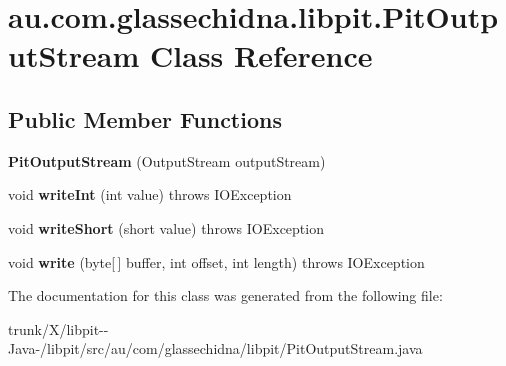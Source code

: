\hypertarget{classau_1_1com_1_1glassechidna_1_1libpit_1_1PitOutputStream}{\section{au.\-com.\-glassechidna.\-libpit.\-Pit\-Output\-Stream Class Reference}
\label{classau_1_1com_1_1glassechidna_1_1libpit_1_1PitOutputStream}
}
\subsection*{Public Member Functions}
\begin{DoxyCompactItemize}
\item 
\hypertarget{classau_1_1com_1_1glassechidna_1_1libpit_1_1PitOutputStream_a996957bf0051735d0c6d2f9ce3fb734b}{{\bfseries Pit\-Output\-Stream} (Output\-Stream output\-Stream)}\label{classau_1_1com_1_1glassechidna_1_1libpit_1_1PitOutputStream_a996957bf0051735d0c6d2f9ce3fb734b}

\item 
\hypertarget{classau_1_1com_1_1glassechidna_1_1libpit_1_1PitOutputStream_a36aea5e260c8e8db312c6ac3453ddd68}{void {\bfseries write\-Int} (int value)  throws I\-O\-Exception 	}\label{classau_1_1com_1_1glassechidna_1_1libpit_1_1PitOutputStream_a36aea5e260c8e8db312c6ac3453ddd68}

\item 
\hypertarget{classau_1_1com_1_1glassechidna_1_1libpit_1_1PitOutputStream_ad8d46d22c478d02af40f961fa3833272}{void {\bfseries write\-Short} (short value)  throws I\-O\-Exception 	}\label{classau_1_1com_1_1glassechidna_1_1libpit_1_1PitOutputStream_ad8d46d22c478d02af40f961fa3833272}

\item 
\hypertarget{classau_1_1com_1_1glassechidna_1_1libpit_1_1PitOutputStream_abf36f7729a6356967465f2599f5e3bd5}{void {\bfseries write} (byte\mbox{[}$\,$\mbox{]} buffer, int offset, int length)  throws I\-O\-Exception 	}\label{classau_1_1com_1_1glassechidna_1_1libpit_1_1PitOutputStream_abf36f7729a6356967465f2599f5e3bd5}

\end{DoxyCompactItemize}


The documentation for this class was generated from the following file\-:\begin{DoxyCompactItemize}
\item 
trunk/\-X/libpit-\/-\/\-Java-\//libpit/src/au/com/glassechidna/libpit/Pit\-Output\-Stream.\-java\end{DoxyCompactItemize}

